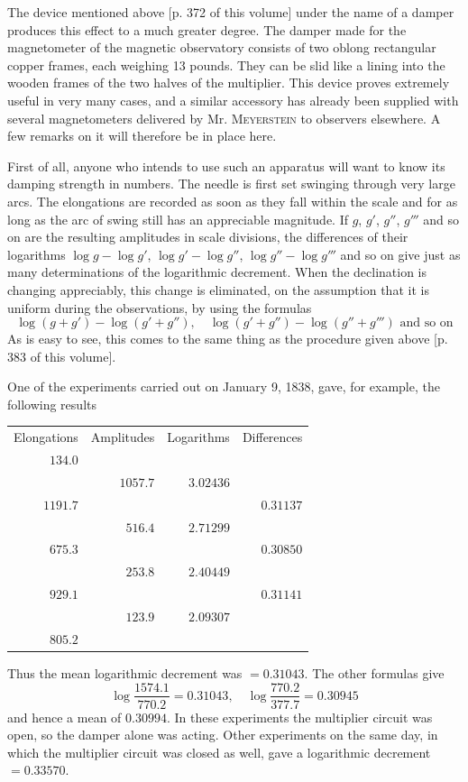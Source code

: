 The device mentioned above [p. 372 of this volume] under the name of a damper produces this effect to a much greater degree. The damper made for the magnetometer of the magnetic observatory consists of two oblong rectangular copper frames, each weighing 13 pounds. They can be slid like a lining into the wooden frames of the two halves of the multiplier. This device proves extremely useful in very many cases, and a similar accessory has already been supplied with several magnetometers delivered by Mr. \textsc{Meyerstein} to observers elsewhere. A few remarks on it will therefore be in place here.

First of all, anyone who intends to use such an apparatus will want to know its damping strength in numbers. The needle is first set swinging through very large arcs. The elongations are recorded as soon as they fall within the scale and for as long as the arc of swing still has an appreciable magnitude. If $g$, $g'$, $g''$, $g'''$ and so on are the resulting amplitudes in scale divisions, the differences of their logarithms $\log g-\log g'$, $\log g'-\log g''$, $\log g''-\log g'''$ and so on give just as many determinations of the logarithmic decrement. When the declination is changing appreciably, this change is eliminated, on the assumption that it is uniform during the observations, by using the formulas
\[
\log(g+g')-\log(g'+g''),\quad \log(g'+g'')-\log(g''+g''')\text{ and so on}
\]
As is easy to see, this comes to the same thing as the procedure given above [p. 383 of this volume].

One of the experiments carried out on January 9, 1838, gave, for example, the following results
\begin{center}
\begin{tabular}{r|r|r|r}
Elongations&Amplitudes&Logarithms&Differences\\
$134.0$&&&\\[-3pt]
&$1057.7$&$3.02436$&\\[-3pt]
$1191.7$&&&$0.31137$\\[-3pt]
&$516.4$&$2.71299$&\\[-3pt]
$675.3$&&&$0.30850$\\[-3pt]
&$253.8$&$2.40449$&\\[-3pt]
$929.1$&&&$0.31141$\\[-3pt]
&$123.9$&$2.09307$&\\[-3pt]
$805.2$&&&
\end{tabular}
\end{center}
Thus the mean logarithmic decrement was $=0.31043$. The other formulas give
\[
\log\frac{1574.1}{770.2}=0.31043,\quad \log\frac{770.2}{377.7}=0.30945
\]
and hence a mean of $0.30994$. In these experiments the multiplier circuit was open, so the damper alone was acting. Other experiments on the same day, in which the multiplier circuit was closed as well, gave a logarithmic decrement $=0.33570$.

